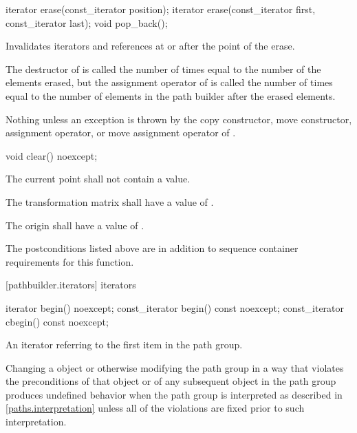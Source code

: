 %
%
\begin{itemdecl}
iterator erase(const_iterator position);
iterator erase(const_iterator first, const_iterator last);
void pop_back();
\end{itemdecl}

\begin{itemdescr}
\pnum
\effects
Invalidates iterators and references at or after the point of the erase.

\pnum
\complexity
The destructor of  is called the number of times equal to 
the number of the elements erased, but the assignment operator
of  is called the number of times equal to the number of
elements in the path builder after the erased elements.

\pnum
\throws
Nothing unless an exception is thrown by the copy constructor, move 
constructor, assignment operator, or move assignment operator of
.
\end{itemdescr}

%
\begin{itemdecl}
void clear() noexcept;
\end{itemdecl}
\begin{itemdescr}
\pnum
\postconditions
\pnum
The current point shall not contain a value.

\pnum
The transformation matrix shall have a value of .

\pnum
The origin shall have a value of .

\pnum
\remarks
The postconditions listed above are in addition to sequence container requirements for this function.
\end{itemdescr}

 [pathbuilder.iterators] { iterators}

%
%
\begin{itemdecl}
iterator begin() noexcept;
const_iterator begin() const noexcept;
const_iterator cbegin() const noexcept;
\end{itemdecl}
\begin{itemdescr}
\pnum
\returns
An iterator referring to the first  item in the path group.

\pnum
\remarks
Changing a  object or otherwise modifying the path group in a way that violates the preconditions of that  object or of any subsequent  object in the path group produces undefined behavior when the path group is interpreted as described in \ref{paths.interpretation} unless all of the violations are fixed prior to such interpretation.
\end{itemdescr}

